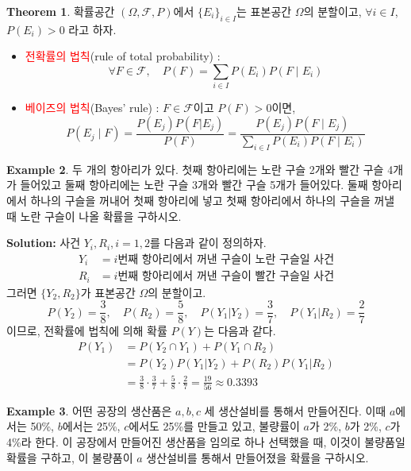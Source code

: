 \documentclass{article}
\theoremstyle{definition}
\newtheorem{theorem}{Theorem}
\newtheorem{example}[theorem]{Example}
\begin{document}
\begin{theorem}
    확률공간 $(\Omega, \mathcal{F}, P)$에서 $\{E_i\}_{i \in I}$는 표본공간 $\Omega$의 분할이고, $\forall i \in I$, $P(E_i) > 0$ 라고 하자.
    \begin{itemize}
        \item \textcolor{red}{전확률의 법칙}(rule of total probability) :
        \[
        \forall F \in \mathcal{F}, \quad P(F) = \sum_{i \in I} P(E_i) P(F \mid E_i)
        \]
        \item \textcolor{red}{베이즈의 법칙}(Bayes' rule) : $F \in \mathcal{F}$이고 $P(F) > 0$이면,
        \[
        P(E_j \mid F) = \frac{P(E_j) P(F|E_j)}{P(F)}= \frac{P(E_j) P(F \mid E_j)}{\sum_{i \in I} P(E_i) P(F \mid E_i)}
        \]
    \end{itemize}
\end{theorem}

\begin{example}
    두 개의 항아리가 있다. 첫째 항아리에는 노란 구슬 2개와 빨간 구슬 4개가 들어있고 둘째 항아리에는 노란 구슬 3개와 빨간 구슬 5개가 들어있다. 둘째 항아리에서 하나의 구슬을 꺼내어 첫째 항아리에 넣고 첫째 항아리에서 하나의 구슬을 꺼낼 때 노란 구슬이 나올 확률을 구하시오.
\end{example}

\noindent
\textbf{Solution:} 사건 $Y_i, R_i, i = 1, 2$를 다음과 같이 정의하자.
\begin{align*}
    Y_i &= i\text{번째 항아리에서 꺼낸 구슬이 노란 구슬일 사건}\\
    R_i &= i\text{번째 항아리에서 꺼낸 구슬이 빨간 구슬일 사건}
\end{align*}
그러면 $\{ Y_2, R_2 \}$가 표본공간 $\Omega$의 분할이고.
\begin{equation*}
    P(Y_2) = \frac38, \quad P(R_2) = \frac58, \quad P(Y_1 | Y_2) = \frac37, \quad P(Y_1 | R_2) = \frac27
\end{equation*}
이므로, 전확률에 법칙에 의해 확률 $P(Y)$는 다음과 같다.
\begin{align*}
    P(Y_1) &= P(Y_2 \cap Y_1) + P(Y_1 \cap R_2)\\
    &= P(Y_2) P(Y_1 | Y_2) + P(R_2)P(Y_1|R_2)\\
    &= \frac38 \cdot \frac37 + \frac58 \cdot \frac27 = \frac{19}{56} \approx 0.3393
\end{align*}

\newpage

\begin{example}
    어떤 공장의 생산품은 $a, b, c$ 세 생산설비를 통해서 만들어진다. 이때 $a$에서는 50\%, $b$에서는 25\%, $c$에서도 25\%를 만들고 있고, 불량률이 $a$가 2\%, $b$가 2\%, $c$가 4\%라 한다. 이 공장에서 만들어진 생산품을 임의로 하나 선택했을 때, 이것이 불량품일 확률을 구하고, 이 불량품이 $a$ 생산설비를 통해서 만들어졌을 확률을 구하시오.
\end{example}
\end{document}
